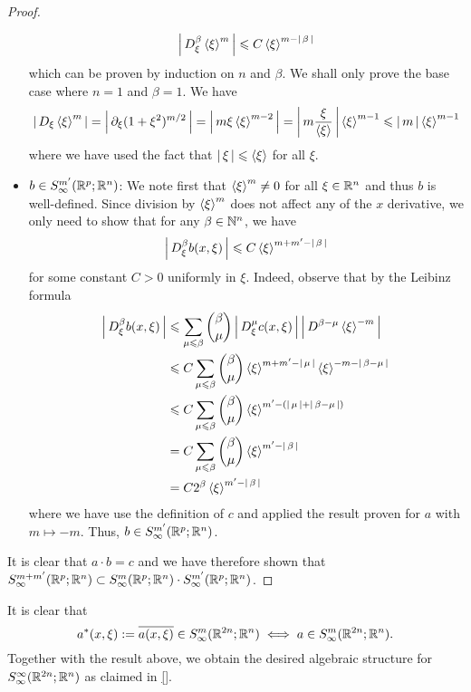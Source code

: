 \documentclass[12pt]{article}
\begin{document}
\begin{proof}
\begin{itemize}
        \[
        \abs{D^\beta_\xi \sym[\xi]^m} \leq C \sym[\xi]^{m - \abs{\beta}}
        \]
        which can be proven by induction on $n$ and $\beta$. We shall only prove the base case where $n = 1$ and $\beta = 1$. We have 
        \begin{align*}
            \abs{D_\xi \sym[\xi]^m} = \abs{\p_\xi (1 + \xi^2)^{m/2}} = \abs{m\xi \sym[\xi]^{m - 2}} = \abs{m \frac{\xi}{\sym[\xi]}} \sym[\xi]^{m - 1} \leq \abs{m} \sym[\xi]^{m - 1}
        \end{align*}
        where we have used the fact that $\abs{\xi} \leq \sym[\xi]$ for all $\xi$. 
        \item $b \in S^{m'}_\infty(\R^p; \R^n)$:  We note first that $\sym[\xi]^m \neq 0$ for all $\xi \in \R^n$ and thus $b$ is well-defined. Since division by $\sym[\xi]^m$ does not affect any of the $x$ derivative, we only need to show that for any $\beta \in \N^n$, we have
        \[
        \abs{D^\beta_\xi b(x, \xi)} \leq C \sym[\xi]^{m + m' - \abs{\beta}}
        \]
        for some constant $C > 0$ uniformly in $\xi$. Indeed, observe that by the Leibinz formula
        \begin{align*}
            \abs{D^\beta_\xi b(x, \xi)} 
            & \leq \sum_{\mu \leq \beta} \binom{\beta}{\mu} \abs{D^\mu_\xi c(x, \xi)} \abs{D^{\beta - \mu} \sym[\xi]^{-m}} \\
            & \leq C \sum_{\mu \leq \beta} \binom{\beta}{\mu} \sym[\xi]^{m + m' - \abs{\mu}} \sym[\xi]^{-m - \abs{\beta - \mu}} \\
            & \leq C \sum_{\mu \leq \beta} \binom{\beta}{\mu} \sym[\xi]^{ m' - (\abs{\mu} +  \abs{\beta - \mu})} \\
            & = C \sum_{\mu \leq \beta} \binom{\beta}{\mu} \sym[\xi]^{ m' -\abs{\beta}} \\
            &= C 2^{\beta} \sym[\xi]^{ m' -\abs{\beta}} 
        \end{align*}
        where we have use the definition of $c$ and applied the result proven for $a$ with $m \mapsto -m$. Thus, $b \in S^{m'}_\infty(\R^p; \R^n)$. 
    \end{itemize}
    It is clear that $a \cdot b = c$ and we have therefore shown that $S^{m + m'}_\infty(\R^p; \R^n) \subset S^{m}_\infty(\R^p; \R^n) \cdot S^{m'}_\infty(\R^p; \R^n)$. 
\end{proof}

It is clear that 
$$ a^*(x, \xi) := \overline{a(x, \xi)} \in S^{m}_\infty(\R^{2n}; \R^n) \iff a \in S^{m}_\infty(\R^{2n}; \R^n). $$ Together with the result above, we obtain the desired algebraic structure for $S^{\infty}_\infty(\R^{2n}; \R^n)$ as claimed in \ref{}. \\
\end{document}

